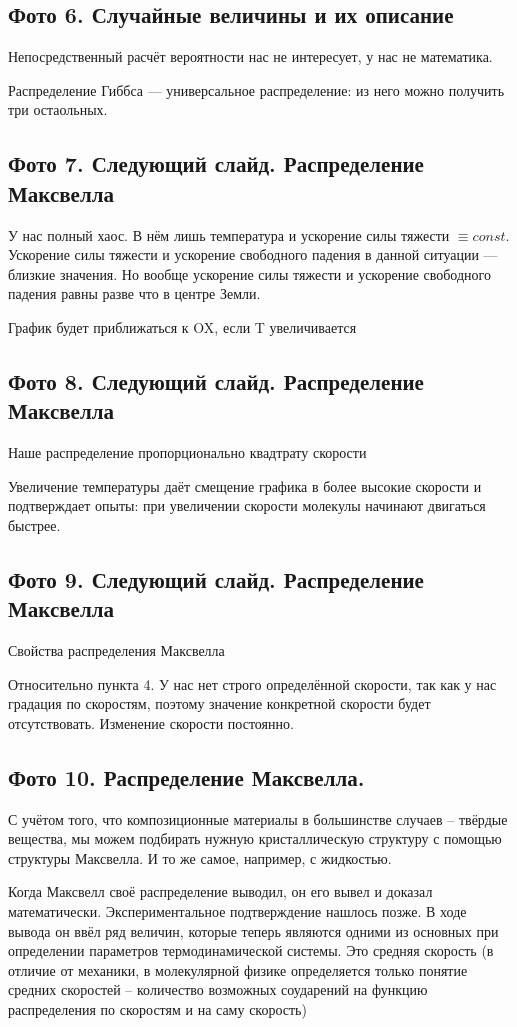 \documentclass[12pt]{article}
\begin{document}
\subsection{Фото 6. Случайные величины и их описание}
\par Непосредственный расчёт вероятности нас не интересует, у нас не математика.
\par Распределение Гиббса --- универсальное распределение: из него можно получить три остаольных.
\subsection{Фото 7. Следующий слайд. Распределение Максвелла}
\par У нас полный хаос. В нём лишь температура и ускорение силы тяжести $\equiv const$. Ускорение силы тяжести и ускорение свободного падения в данной ситуации --- близкие значения. Но вообще ускорение силы тяжести и ускорение свободного падения равны разве что в центре Земли.
\par График будет приближаться к OX, если T увеличивается
\subsection{Фото 8. Следующий слайд. Распределение Максвелла}
\par Наше распределение пропорционально квадтрату скорости
\par Увеличение температуры даёт смещение графика в более высокие скорости и подтверждает опыты: при увеличении скорости молекулы начинают двигаться быстрее.
\subsection{Фото 9. Следующий слайд. Распределение Максвелла}
\par Свойства распределения Максвелла
\par Относительно пункта 4. У нас нет строго определённой скорости, так как у нас градация по скоростям, поэтому значение конкретной скорости будет отсутствовать. Изменение скорости постоянно.
\subsection{Фото 10. Распределение Максвелла.}
\par С учётом того, что композиционные материалы в большинстве случаев -- твёрдые вещества, мы можем подбирать нужную кристаллическую структуру с помощью структуры Максвелла. И то же самое, например, с жидкостью.
\par Когда Максвелл своё распределение выводил, он его вывел и доказал математически. Экспериментальное подтверждение нашлось позже. В ходе вывода он ввёл ряд величин, которые теперь являются одними из основных при определении параметров термодинамической системы. Это средняя скорость (в отличие от механики, в молекулярной физике определяется только понятие средних скоростей -- количество возможных соударений на функцию распределения по скоростям и на саму скорость)
\end{document}
